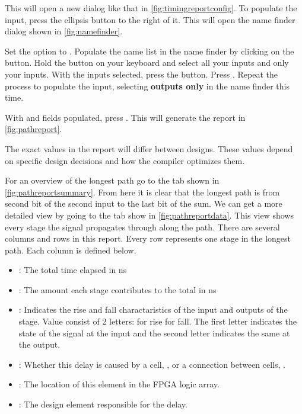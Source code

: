 \documentclass[12pt]{labmanual}
\begin{document}
\begin{minipage}[t]{0.45\textwidth}
\vspace{-112mm}
This will open a new dialog like that in \autoref{fig:timingreportconfig}. To populate the  input, press the ellipsis button to the right of it. This will open the name finder dialog shown in \autoref{fig:namefinder}. 

Set the  option to . Populate the name list in the name finder by clicking on the  button. Hold the  button on your keyboard and select all your inputs and only your inputs. With the inputs selected, press the \keyword{$>$} button. Press . Repeat the process to populate the  input, selecting \textbf{outputs only} in the name finder this time.

With  and  fields populated, press . This will generate the report in \autoref{fig:pathreport}.
\hfill\break
\begin{extra}[frametitle={Report Values}]
    The exact values in the report will differ between designs. These values depend on specific design decisions and how the compiler optimizes them.
\end{extra}
\hfill\break
\end{minipage}

\clearpage

For an overview of the longest path go to the  tab shown in \autoref{fig:pathreportsummary}. From here it is clear that the longest path is from second bit of the second input to the last bit of the sum. We can get a more detailed view by going to the  tab show in \autoref{fig:pathreportdata}. This view shows every stage the signal propagates through along the path. There are several columns and rows in this report. Every row represents one stage in the longest path. Each column is defined below.
\begin{itemize}
    \item {}: The total time elapsed in ns
    \item {}: The amount each stage contributes to the total in ns
    \item {}: Indicates the rise and fall charactaristics of the input and outputs of the stage. Value consist of 2 letters:  for rise  for fall. The first letter indicates the state of the signal at the input and the second letter indicates the same at the output.
    \item {}: Whether this delay is caused by a cell, , or a connection between cells, .
    \item {}: The location of this element in the FPGA logic array.
    \item {}: The design element responsible for the delay.
\end{itemize}
\end{document}

